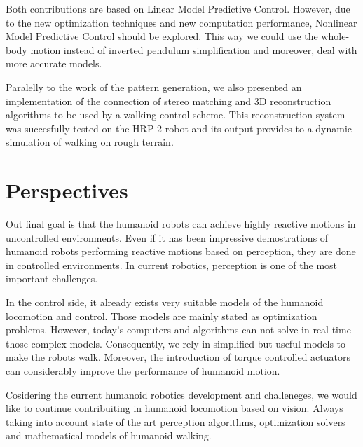 Both contributions are based on Linear Model Predictive Control. However, due to the new optimization techniques and new computation performance, Nonlinear Model Predictive Control should be explored. This way we could use the whole-body motion instead of inverted pendulum simplification and moreover, deal with more accurate models.

Paralelly to the work of the pattern generation, we also presented an implementation of the connection of stereo matching and 3D reconstruction algorithms to be used by a walking control scheme. This reconstruction system was succesfully tested on the HRP-2 robot and its output provides to a dynamic simulation of walking on rough terrain.

\section{Perspectives}

Out final goal is that the humanoid robots can achieve highly reactive motions in uncontrolled environments. Even if it has been impressive demostrations of humanoid robots performing reactive motions based on perception, they are done in controlled environments. In current robotics, perception is one of the most important challenges.

In the control side, it already exists very suitable models of the humanoid locomotion and control. Those models are mainly stated as optimization problems. However, today's computers and algorithms can not solve in real time those complex models. Consequently, we rely in simplified but useful models to make the robots walk. Moreover, the introduction of torque controlled actuators can considerably improve the performance of humanoid motion.

Cosidering the current humanoid robotics development and challeneges, we would like to continue contribuiting in humanoid locomotion based on vision. Always taking into account state of the art perception algorithms, optimization solvers and mathematical models of humanoid walking.

